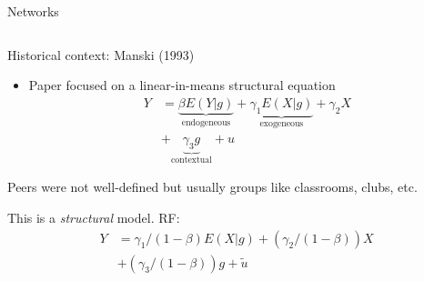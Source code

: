 \documentclass[notes,11pt, aspectratio=169]{beamer}
\newenvironment{wideitemize}{\itemize\addtolength{\itemsep}{10pt}}{\enditemize}
\begin{document}
\begin{frame}{Networks}
\begin{columns}[T] %
  \begin{column}{.5\textwidth}
    \begin{wideitemize}
    \item Historical context: Manski (1993)
      \begin{itemize}
      \item Paper focused on a linear-in-means structural equation
        \begin{align*}
          Y &= \underbrace{\beta E(Y|g)}_{\text{endogeneous}} + \underbrace{\gamma_{1} E(X|g)}_{\text{exogeneous}} + \gamma_{2} X\\
          &+ \underbrace{\gamma_{3} g}_{\text{contextual}} + u 
        \end{align*}
      \end{itemize}
    \item Peers were not well-defined but usually groups like
      classrooms, clubs, etc.
    \item This is a \emph{structural} model. RF:
      \begin{align*}
        Y &=  \gamma_{1}/(1-\beta) E(X|g) + (\gamma_{2}/(1-\beta)) X\\
          &+ (\gamma_{3}/(1-\beta)) g + \tilde{u} 
        \end{align*}


\end{wideitemize}
\end{column}
\end{columns}
\end{frame}
\end{document}
